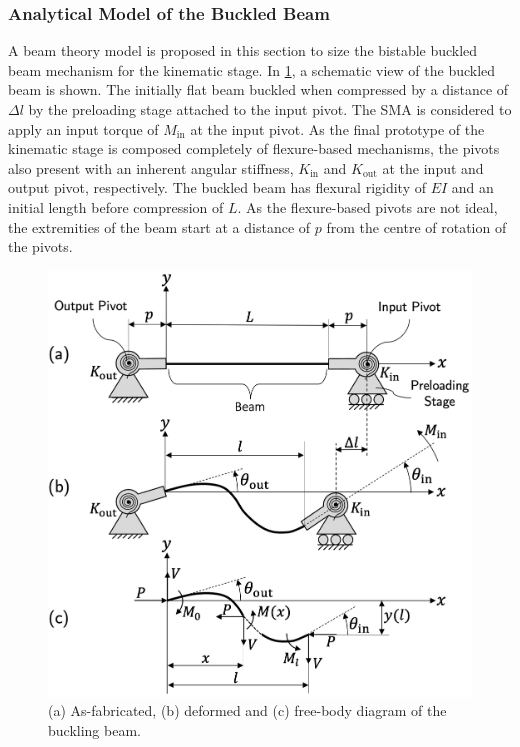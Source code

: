 \subsubsection{Analytical Model of the Buckled Beam}
A beam theory model is proposed in this section to size the bistable buckled beam mechanism for the kinematic stage. In \cref{fig:buckled-beam-schematic}, a schematic view of the buckled beam is shown. The initially flat beam buckled when compressed by a distance of $\Delta l$ by the preloading stage attached to the input pivot. The SMA is considered to apply an input torque of $M_\mathrm{in}$ at the input pivot. As the final prototype of the kinematic stage is composed completely of flexure-based mechanisms, the pivots also present with an inherent angular stiffness, $K_\mathrm{in}$ and $K_\mathrm{out}$ at the input and output pivot, respectively. The buckled beam has  flexural rigidity of $EI$ and an initial length before compression of $L$. As the flexure-based pivots are not ideal, the extremities of the beam start at a distance of $p$ from the centre of rotation of the pivots.
\begin{figure}[hbt!] %
  \centering
  \includegraphics[width=0.7\columnwidth]{images/chap7/buckled_beam_model.png}
  \caption{(a) As-fabricated, (b) deformed and (c) free-body diagram of the buckling beam.}
  \label{fig:buckled-beam-schematic}
\end{figure}

